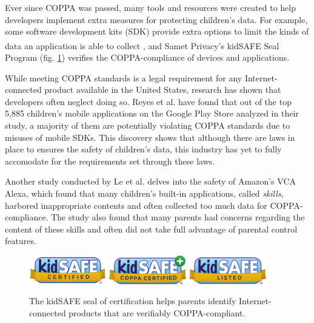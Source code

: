 \documentclass[12pt]{ucthesis}
\begin{document}
Ever since COPPA was passed, many tools and resources were created to help developers implement extra measures for protecting children's data. For example, some software development kits (SDK) provide extra options to limit the kinds of data an application is able to collect \cite{reyes:coppa}, and Samet Privacy's kidSAFE\textsuperscript{\textregistered} Seal Program (fig. \ref{fig:kidsafe}) verifies the COPPA-compliance of devices and applications.

While meeting COPPA standards is a legal requirement for any Internet-connected product available in the United States, research has shown that developers often neglect doing so. Reyes et al. \cite{reyes:coppa} have found that out of the top 5,885 children's mobile applications on the Google Play Store analyzed in their study, a majority of them are potentially violating COPPA standards due to misuses of mobile SDKs. This discovery shows that although there are laws in place to ensures the safety of children's data, this industry has yet to fully accomodate for the requirements set through these laws. 

Another study conducted by Le et al. \cite{le:skillbot} delves into the safety of Amazon's VCA Alexa, which found that many children's built-in applications, called \textit{skills}, harbored inappropriate contents and often collected too much data for COPPA-compliance. The study also found that many parents had concerns regarding the content of these skills and often did not take full advantage of parental control features.

\begin{figure}
    \centering
    \label{fig:kidsafe}
    \includegraphics[width=0.3\textwidth]{kidsafe1.png}
    \includegraphics[width=0.3\textwidth]{kidsafe2.png}
    \includegraphics[width=0.3\textwidth]{kidsafe3.png}
    \caption{The kidSAFE seal of certification helps parents identify Internet-connected products that are verifiably COPPA-compliant.}
\end{figure}
\end{document}
